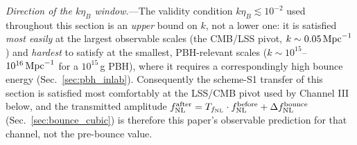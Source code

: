 \documentclass[aps,prd,twocolumn,superscriptaddress,nofootinbib,longbibliography]{revtex4-2}
\newcommand{\fnl}{f_{\rm NL}}
\begin{document}
\textit{Direction of the $k\eta_B$ window.}---The validity condition
$k\eta_B\lesssim10^{-2}$ used throughout this section is an \emph{upper}
bound on $k$, not a lower one: it is satisfied \emph{most easily} at the
largest observable scales (the CMB/LSS pivot, $k\sim0.05\,{\rm Mpc}^{-1}$)
and \emph{hardest} to satisfy at the smallest, PBH-relevant scales
($k\sim10^{15}$--$10^{16}\,{\rm Mpc}^{-1}$ for a $10^{15}\,$g PBH), where it
requires a correspondingly high bounce energy (Sec.~\ref{sec:pbh_inlab}).
Consequently the scheme-S1 transfer of this section is satisfied most
comfortably at the LSS/CMB pivot used by Channel III below, and the
transmitted amplitude $\fnl^{\rm after}=T_{\fnl}\cdot\fnl^{\rm before}
+\Delta\fnl^{\rm bounce}$ (Sec.~\ref{sec:bounce_cubic}) is therefore this
paper's observable prediction for that channel, not the pre-bounce value.
\end{document}
